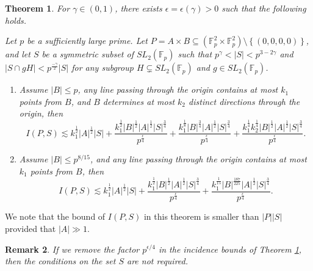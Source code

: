 \documentclass[11pt]{article}
\newtheorem{theorem}{Theorem}[section]
\newtheorem{remark}[theorem]{Remark}
\def\thang#1{\noindent
\textcolor{blue}
{\textsc{(Thang:}
\textsf{#1})}}
\def\thang#1{\noindent
\textcolor{blue}
{\textsc{(Thang:}
\textsf{#1})}}
\def\Fbb{\mathbb{F}}
\def\SL{SL}
\def\l({\left(}
\def\r){\right)}
\def\lv{\left\vert}
\def\rv{\right\vert}
\def\lo{\left\{}
\def\ro{\right\}}
\begin{document}
\begin{theorem}\label{incidence-energy'}
For $\gamma\in (0, 1)$, there exists $\epsilon=\epsilon(\gamma)>0$ such that the following holds.

    Let $p$ be a sufficiently large prime. Let $P =A \times B \subseteq \l( \Fbb_p^2 \times \Fbb_p^2 \r) \setminus \lo (0, 0, 0, 0)\ro $, and let $S$ be a symmetric subset of $\SL_2 \l( \Fbb_p \r)$ such that $p^\gamma < \lv S\rv < p^{3-2\gamma} $ and $\lv S\cap gH \rv < p^{\frac{-\gamma}{2}}\lv S\rv$ for any subgroup $H \subsetneq \SL_2 \l( \Fbb_p \r)$ and $g \in \SL_2 \l( \Fbb_p \r)$. 
    \begin{enumerate}
        \item Assume $|B|\le p$, any line passing through the origin contains at most $k_1$ points from $B$, and $B$ determines at most $k_2$ distinct directions through the origin, then
        \[ I(P,S) \lesssim k_1^{\frac{1}{2}}|A|^{\frac{1}{2}}|S|+  \frac{k_1^{\frac{1}{2}}\lv B\rv^{\frac{1}{2}}|A|^{\frac{1}{2}}|S|^{\frac{3}{4}}}{p^{\frac{\epsilon}{4}}} + \frac{k_1^{\frac{1}{8}}\lv B\rv^{\frac{3}{4}}|A|^{\frac{1}{2}} |S|^{\frac{3}{4}}}{p^{\frac{\epsilon}{4}}}+\frac{k_1^{\frac{1}{4}}k_2^{\frac{1}{4}}\lv B\rv^{\frac{1}{2}} |A|^{\frac{1}{2}}|S|^{\frac{3}{4}}}{p^{\frac{\epsilon}{4}}}.\]
        \item Assume $|B|\le p^{8/15}$, and any line passing through the origin contains at most $k_1$ points from $B$, then
        \[ I(P,S) \lesssim  k_1^{\frac{1}{2}}|A|^{\frac{1}{2}}|S|+  \frac{k_1^{\frac{1}{2}}\lv B\rv^{\frac{1}{2}}|A|^{\frac{1}{2}}|S|^{\frac{3}{4}}}{p^{\frac{\epsilon}{4}}}+\frac{k_1^{\frac{1}{15}}|B|^{\frac{187}{225}} |A|^{\frac{1}{2}} |S|^{\frac{3}{4}}}{p^{\frac{\epsilon}{4}}}.\]
    \end{enumerate}
\end{theorem}
We note that the bound of $I(P, S)$ in this theorem is smaller than $|P||S|$ provided that $|A|\gg 1$.

\begin{remark}\label{rm24}
    If we remove the factor $p^{\epsilon/4}$ in the incidence bounds of Theorem \ref{incidence-energy'}, then the conditions on the set $S$ are not required.
\end{remark}

\end{document}
